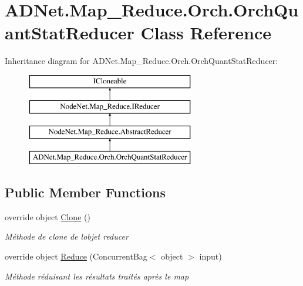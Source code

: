 \hypertarget{class_a_d_net_1_1_map___reduce_1_1_orch_1_1_orch_quant_stat_reducer}{}\section{A\+D\+Net.\+Map\+\_\+\+Reduce.\+Orch.\+Orch\+Quant\+Stat\+Reducer Class Reference}
\label{class_a_d_net_1_1_map___reduce_1_1_orch_1_1_orch_quant_stat_reducer}
Inheritance diagram for A\+D\+Net.\+Map\+\_\+\+Reduce.\+Orch.\+Orch\+Quant\+Stat\+Reducer\+:\begin{figure}[H]
\begin{center}
\leavevmode
\includegraphics[height=4.000000cm]{class_a_d_net_1_1_map___reduce_1_1_orch_1_1_orch_quant_stat_reducer}
\end{center}
\end{figure}
\subsection*{Public Member Functions}
\begin{DoxyCompactItemize}
\item 
override object \hyperlink{class_a_d_net_1_1_map___reduce_1_1_orch_1_1_orch_quant_stat_reducer_aa4e7f32de6293b9265797dbb668e7dc2}{Clone} ()
\begin{DoxyCompactList}\small\item\em Méthode de clone de l\textquotesingle{}objet reducer \end{DoxyCompactList}\item 
override object \hyperlink{class_a_d_net_1_1_map___reduce_1_1_orch_1_1_orch_quant_stat_reducer_a8fbc2655df6b1f0e8943107f195a01b0}{Reduce} (Concurrent\+Bag$<$ object $>$ input)
\begin{DoxyCompactList}\small\item\em Méthode réduisant les résultats traités après le map \end{DoxyCompactList}\end{DoxyCompactItemize}



